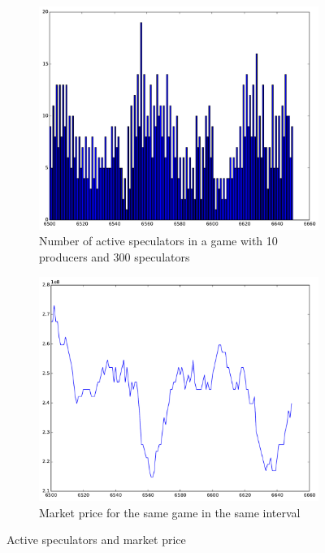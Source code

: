 \begin{figure}[h!]
\begin{center}
	\begin{subfigure}[b]{0.5\textwidth}
	\includegraphics[scale=0.4]{images/minority/active_speculators_np10_ns300.pdf}
	\caption{Number of active speculators in a game with 10 producers and 300 speculators}
	\end{subfigure}
	\begin{subfigure}[b]{0.5\textwidth}
	\includegraphics[scale=0.4]{images/minority/market_price_np10_ns300.pdf}
	\caption{Market price for the same game in the same interval}
	\end{subfigure}
\caption{Active speculators and market price}
\label{fig:active speculators}
\end{center}
\end{figure}

